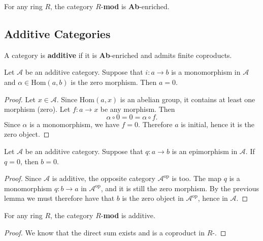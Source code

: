 \begin{lemma}
  For any ring $ R $, the category $ R $-\textbf{mod} is \textbf{Ab}-enriched.
\end{lemma}

\subsection{Additive Categories} %
\label{sub:additive_categories}
\begin{definition}
A category is \textbf{additive} if it is \textbf{Ab}-enriched and admits finite coproducts.
\end{definition}

\begin{lemma}
  Let $ \mathcal{A} $ be an additive category. Suppose that $ i: a \to b $ is a monomorphism in $ \mathcal{A} $ and $ \alpha \in \text{Hom}(a,b) $ is the zero morphism. Then $ a = 0 $.
\end{lemma}
\begin{proof}
  Let $ x \in \mathcal{A} $. Since $ \text{Hom}(a, x) $ is an abelian group, it contains at least one morphism (zero). Let $ f: a \to x $ be any morphism. Then
  \begin{equation*}
  \alpha\circ 0 = 0 = \alpha \circ f
  .\end{equation*}
  Since $ \alpha $ is a monomorphism, we have $ f = 0 $. Therefore $ a $ is initial, hence it is the zero object.
\end{proof}

\begin{lemma}
  Let $ \mathcal{A} $ be an additive category. Suppose that $ q: a \to b $ is an epimorphism in $ \mathcal{A} $. If $ q = 0 $, then $ b = 0 $.
\end{lemma}
\begin{proof}
  Since $ \mathcal{A} $ is additive, the opposite category $ \mathcal{A}^{\text{op}} $ is too. The map $ q $ is a monomorphism $ q: b \to a $ in $ \mathcal{A}^{\text{op}} $, and it is still the zero morphism. By the previous lemma we must therefore have that $ b $ is the zero object in $ \mathcal{A}^{\text{op}} $, hence in $ \mathcal{A} $.
\end{proof}

\begin{lemma}
   For any ring $ R $, the category $ R $-\textbf{mod} is additive.
\end{lemma}
\begin{proof}
  We know that the direct sum exists and is a coproduct in $ R $-.
\end{proof}

